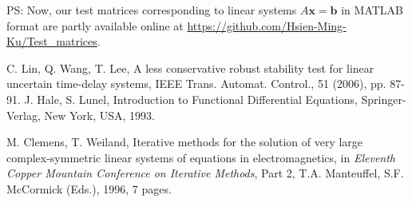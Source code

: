 \documentclass[12pt]{article}
\begin{document}
PS: Now, our test matrices corresponding to linear systems $A{\bm x} = {\bm b}$ in 
MATLAB format are partly available online at \url{https://github.com/Hsien-Ming-Ku/Test_matrices}.



\begin{thebibliography}{1}
C. Lin, Q. Wang, T. Lee, A less conservative robust stability test for linear
uncertain time-delay systems, IEEE Trans. Automat. Control., 51 (2006),
pp. 87-91.
%
J. Hale, S. Lunel, Introduction to Functional Differential Equations, Springer-Verlag,
New York, USA, 1993.

M. Clemens, T. Weiland, Iterative methods for the solution of very large complex-symmetric
linear systems of equations in electromagnetics, in \textit{Eleventh Copper Mountain
Conference on Iterative Methods}, Part 2, T.A. Manteuffel, S.F. McCormick (Eds.),
1996, 7 pages.


\end{thebibliography}
\end{document}
